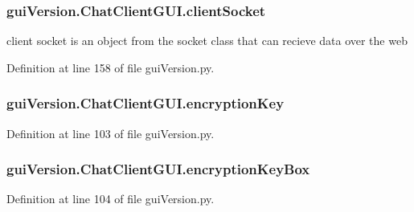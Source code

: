 \subsubsection[{client\+Socket}]{\setlength{\rightskip}{0pt plus 5cm}gui\+Version.\+Chat\+Client\+G\+U\+I.\+client\+Socket}\label{classgui_version_1_1_chat_client_g_u_i_ad0d119fff1856994d498e1e9861451d5}


client socket is an object from the socket class that can recieve data over the web 



Definition at line 158 of file gui\+Version.\+py.

\hypertarget{classgui_version_1_1_chat_client_g_u_i_aafa39a201580f18372e0911d9667ccbd}{}
\subsubsection[{encryption\+Key}]{\setlength{\rightskip}{0pt plus 5cm}gui\+Version.\+Chat\+Client\+G\+U\+I.\+encryption\+Key}\label{classgui_version_1_1_chat_client_g_u_i_aafa39a201580f18372e0911d9667ccbd}


Definition at line 103 of file gui\+Version.\+py.

\hypertarget{classgui_version_1_1_chat_client_g_u_i_a61e070d785a0e8308bf1a26788075258}{}
\subsubsection[{encryption\+Key\+Box}]{\setlength{\rightskip}{0pt plus 5cm}gui\+Version.\+Chat\+Client\+G\+U\+I.\+encryption\+Key\+Box}\label{classgui_version_1_1_chat_client_g_u_i_a61e070d785a0e8308bf1a26788075258}


Definition at line 104 of file gui\+Version.\+py.

\hypertarget{classgui_version_1_1_chat_client_g_u_i_a4436c621e5f3c806218c2756edf488f7}{}
